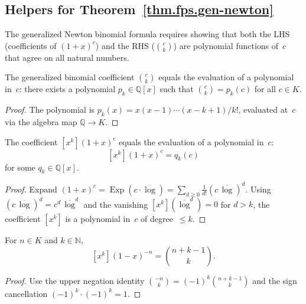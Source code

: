 \subsection{Helpers for Theorem~\ref{thm.fps.gen-newton}}

The generalized Newton binomial formula requires showing that both the LHS
(coefficients of $(1+x)^c$) and the RHS ($\binom{c}{k}$) are polynomial
functions of~$c$ that agree on all natural numbers.

\begin{lemma}
\label{lem.fps.Ring-choose-eq-choosePoly-eval}
\leanhelper
\leanok
The generalized binomial coefficient $\binom{c}{k}$ equals the evaluation
of a polynomial in~$c$: there exists a polynomial $p_k\in\mathbb{Q}[x]$ such that
$\binom{c}{k} = p_k(c)$ for all $c\in K$.
\end{lemma}

\begin{proof}
The polynomial is $p_k(x) = x(x-1)\cdots(x-k+1)/k!$,
evaluated at~$c$ via the algebra map $\mathbb{Q} \to K$.
\end{proof}

\begin{lemma}
\label{lem.fps.coeff-fpsPow-eq-coeffExpPoly-eval}
\leanhelper
\leanok
The coefficient $[x^k](1+x)^c$ equals the evaluation of a polynomial in~$c$:
\[
[x^k](1+x)^c = q_k(c)
\]
for some $q_k\in\mathbb{Q}[x]$.
\end{lemma}

\begin{proof}
Expand $(1+x)^c = \operatorname{Exp}(c\cdot\overline{\log})
= \sum_{d\ge 0}\frac{1}{d!}(c\,\overline{\log})^d$.
Using $(c\,\overline{\log})^d = c^d\,\overline{\log}^d$
and the vanishing $[x^k](\overline{\log}^d)=0$ for $d>k$,
the coefficient $[x^k]$ is a polynomial in~$c$ of degree~$\leq k$.
\end{proof}

\begin{lemma}
\label{lem.fps.one-sub-X-pow-neg-coeff}
\leanhelper
\leanok
For $n\in K$ and $k\in\mathbb{N}$,
\[
[x^k](1-x)^{-n} = \binom{n+k-1}{k}.
\]
\end{lemma}

\begin{proof}
\leanok
Use the upper negation identity $\binom{-n}{k} = (-1)^k\binom{n+k-1}{k}$
and the sign cancellation $(-1)^k\cdot(-1)^k = 1$.
\end{proof}

